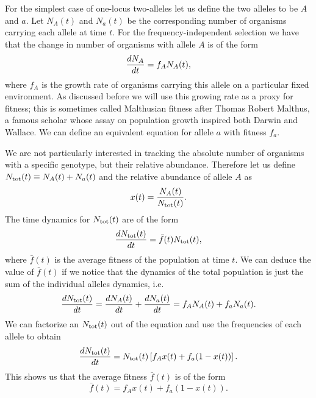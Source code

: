 For the simplest case of one-locus two-alleles let us define the two alleles to
be $A$ and $a$. Let $N_A(t)$ and $N_a(t)$ be the corresponding number of
organisms carrying each allele at time $t$. For the frequency-independent 
selection we have that the change in number of organisms with allele $A$ is of
the form
\begin{equation}
  {d{N_A} \over dt} = f_A N_A(t),
  \label{eq_expo_growth}
\end{equation}
where $f_A$ is the growth rate of organisms carrying this allele on a
particular fixed environment. As discussed before we will use this growing rate
as a proxy for fitness; this is sometimes called Malthusian fitness after
Thomas Robert Malthus, a famous scholar whose assay on population growth
inspired both Darwin and Wallace. We can define an equivalent equation for
allele $a$ with fitness $f_a$.

We are not particularly interested in tracking the absolute number of organisms
with a specific genotype, but their relative abundance. Therefore let us define
$N_{\text{tot}}(t) \equiv N_A(t) + N_a(t)$ and the relative abundance of allele $A$ as
\begin{equation}
  x(t) = {N_A(t) \over N_{\text{tot}}(t)}.
\end{equation}
The time dynamics for $N_{\text{tot}}(t)$ are of the form
\begin{equation}
  {d{N_{\text{tot}}(t)} \over dt} = \bar{f}(t) N_{\text{tot}}(t),
\end{equation}
where $\bar{f}(t)$ is the average fitness of the population at time $t$. We can
deduce the value of $\bar{f}(t)$ if we notice that the dynamics of the total
population is just the sum of the individual alleles dynamics, i.e.
\begin{equation}
  {d{N_{\text{tot}}(t)} \over dt} = {d{N_A(t)} \over dt} + {d{N_a(t)} \over dt} = f_A N_A(t) + f_a N_a(t).
\end{equation}
We can factorize an $N_{\text{tot}}(t)$ out of the equation and use the frequencies of
each allele to obtain
\begin{equation}
  {d{N_{\text{tot}}(t)} \over dt} = N_{\text{tot}}(t) \left[ f_A x(t) + f_a (1 - x(t)) \right].
\end{equation}
This shows us that the average fitness $\bar{f}(t)$ is of the form
\begin{equation}
  \bar{f}(t) = f_A x(t) + f_a (1 - x(t)).
\end{equation}

